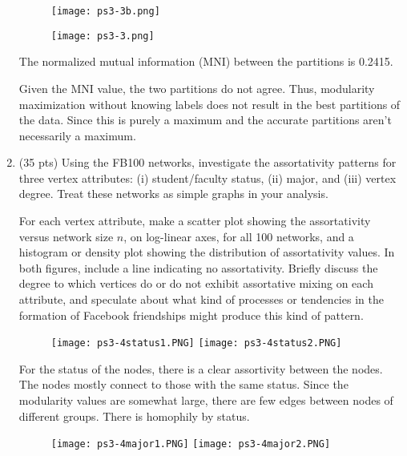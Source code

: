 \documentclass[12pt,letterpaper]{article}
\begin{document}
\begin{enumerate}
\begin{itemize}
    \end{itemize}

    \begin{figure}[!h]
        \centering
        \texttt{[image: ps3-3b.png]}
    \end{figure}


    \begin{figure}[!h]
        \centering
        \texttt{[image: ps3-3.png]}
    \end{figure}

    The normalized mutual information (MNI) between the partitions is 0.2415.

    Given the MNI value, the two partitions do not agree. Thus, modularity maximization without knowing labels does not result in the best partitions of the data. Since this is purely a maximum and the accurate partitions aren't necessarily a maximum.

    \newpage
    \item  (35 pts) Using the FB100 networks, investigate the assortativity patterns for three vertex attributes: (i) student/faculty status, (ii) major, and (iii) vertex degree. Treat these networks as simple graphs in your analysis.

    For each vertex attribute, make a scatter plot showing the assortativity versus network size $n$, on log-linear axes, for all 100 networks, and a histogram or density plot showing the distribution of assortativity values. In both figures, include a line indicating no assortativity. Briefly discuss the degree to which vertices do or do not exhibit assortative mixing on each attribute, and speculate about what kind of processes or tendencies in the formation of Facebook friendships might produce this kind of pattern.

    \begin{figure}[!h]
        \centering
        \texttt{[image: ps3-4status1.PNG]}
        \texttt{[image: ps3-4status2.PNG]}
    \end{figure}

    For the status of the nodes, there is a clear assortivity between the nodes. The nodes mostly connect to those with the same status. Since the modularity values are somewhat large, there are few edges between nodes of different groups. There is homophily by status.

    \begin{figure}[!h]
        \centering
        \texttt{[image: ps3-4major1.PNG]}
        \texttt{[image: ps3-4major2.PNG]}
    \end{figure}


\end{enumerate}
\end{document}
